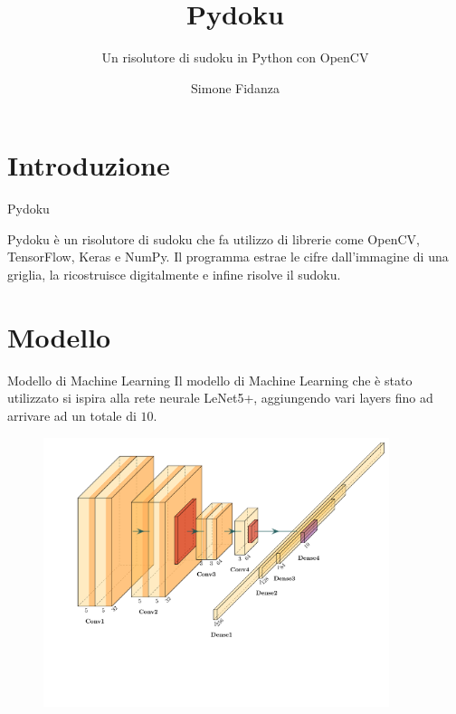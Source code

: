 \documentclass[10pt]{beamer}
\title{Pydoku}
\subtitle{Un risolutore di sudoku in Python con OpenCV}
\date{\DTMDisplaydate{2022}{07}{22}{}}
\author{Simone Fidanza}
\institute{Università degli studi di Bari ``Aldo Moro''}
\begin{document}
\maketitle

\section[Introduzione]{Introduzione}

\begin{frame}[fragile]{Pydoku}

    Pydoku è un risolutore di sudoku che fa utilizzo di librerie come OpenCV,
    TensorFlow, Keras e NumPy. Il programma estrae le cifre dall'immagine di
    una griglia, la ricostruisce digitalmente e infine risolve il sudoku.

\end{frame}

\section{Modello}

\begin{frame}{Modello di Machine Learning}
    Il modello di Machine Learning che è stato utilizzato si ispira alla rete
    neurale LeNet5+, aggiungendo vari layers fino ad arrivare ad un totale di \(10\).

    \vfill
    \begin{figure}
        \includegraphics[width=0.9\textwidth, trim = 1cm 4.5cm 0cm 1cm]{architecture.pdf}
    \end{figure}

\end{frame}
\end{document}
